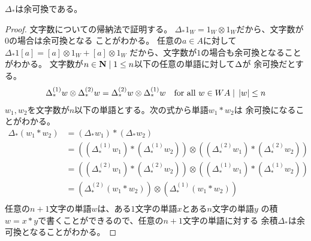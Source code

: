	\begin{proposition}\label{prop:Delta_*は余可換} %
		$\Delta_*$は余可換である。
	\end{proposition} %
	\begin{proof} %
		文字数についての帰納法で証明する。
		$\Delta_*1_W=1_W\otimes 1_W$だから、文字数が$0$の場合は余可換となる
		ことがわかる。
		任意の$a\in A$に対して$\Delta_*1[a]=[a]\otimes 1_W+[a]\otimes 1_W$
		だから、文字数が$1$の場合も余可換となることがわかる。
		文字数が$n\in{\mathbf{N}}\;\vert\; 1\le n$以下の任意の単語に対して$\Delta\*$が
		余可換だとする。
		\begin{equation*}\begin{split} %
			\Delta_*^{(1)}w\otimes\Delta_*^{(2)}w
			=\Delta_*^{(2)}w\otimes\Delta_*^{(1)}w
			\quad\text{for all }w\in WA\bou \zettai{w}\le n
		\end{split}\end{equation*} %
		$w_1,w_2$を文字数が$n$以下の単語とする。次の式から単語$w_1*w_2$は
		余可換になることがわかる。
		\begin{equation*}\begin{split} %
			\Delta_*(w_1*w_2) &= (\Delta_*w_1)*(\Delta_*w_2) \\
			&= \left((\Delta_*^{(1)}w_1)*(\Delta_*^{(1)}w_2)\right)
			\otimes \left((\Delta_*^{(2)}w_1)*(\Delta_*^{(2)}w_2)\right) \\
			&= \left((\Delta_*^{(2)}w_1)*(\Delta_*^{(2)}w_2)\right)
			\otimes \left((\Delta_*^{(1)}w_1)*(\Delta_*^{(1)}w_2)\right) \\
			& = \left(\Delta_*^{(2)}(w_1*w_2)\right)
			\otimes \left(\Delta_*^{(1)}(w_1*w_2)\right) \\
		\end{split}\end{equation*} %
		任意の$n+1$文字の単語$w$は、ある$1$文字の単語$x$とある$n$文字の単語$y$
		の積$w=x*y$で書くことができるので、任意の$n+1$文字の単語に対する
		余積$\Delta_*$は余可換となることがわかる。
	\end{proof} %

